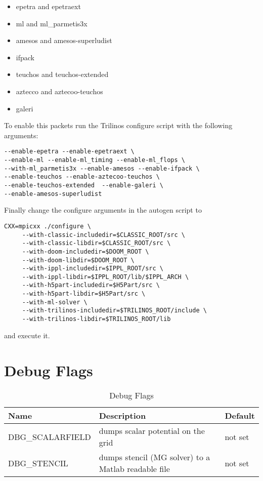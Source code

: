 \begin{itemize}
  \item epetra and epetraext
  \item ml and ml\_parmetis3x
  \item amesos and amesos-superludist
  \item ifpack
  \item teuchos and teuchos-extended
  \item aztecco and aztecoo-teuchos
  \item galeri 
\end{itemize}
To enable this packets run the Trilinos configure script with the following arguments:
\begin{verbatim}
--enable-epetra --enable-epetraext \
--enable-ml --enable-ml_timing --enable-ml_flops \
--with-ml_parmetis3x --enable-amesos --enable-ifpack \
--enable-teuchos --enable-aztecoo-teuchos \
--enable-teuchos-extended  --enable-galeri \
--enable-amesos-superludist
\end{verbatim}
Finally change the configure arguments in the \opal autogen script to
\begin{verbatim}
CXX=mpicxx ./configure \
     --with-classic-includedir=$CLASSIC_ROOT/src \
     --with-classic-libdir=$CLASSIC_ROOT/src \
     --with-doom-includedir=$DOOM_ROOT \
     --with-doom-libdir=$DOOM_ROOT \
     --with-ippl-includedir=$IPPL_ROOT/src \
     --with-ippl-libdir=$IPPL_ROOT/lib/$IPPL_ARCH \
     --with-h5part-includedir=$H5Part/src \
     --with-h5part-libdir=$H5Part/src \
     --with-ml-solver \
     --with-trilinos-includedir=$TRILINOS_ROOT/include \
     --with-trilinos-libdir=$TRILINOS_ROOT/lib
\end{verbatim}
and execute it.

\section{Debug Flags}\label{sec:debugflags}

\begin{table}[ht]\footnotesize
\begin{center}
\begin{tabular}{lll}
\hline
{\bf Name} & {\bf Description} & {\bf Default} \\
\hline
DBG\_SCALARFIELD & dumps scalar potential on the grid & not set \\
DBG\_STENCIL & dumps stencil (MG solver) to a Matlab readable file & not set \\
\hline
\end{tabular}
\caption{Debug Flags}
\label{tbl:debug_flags}
\end{center}
\end{table}

